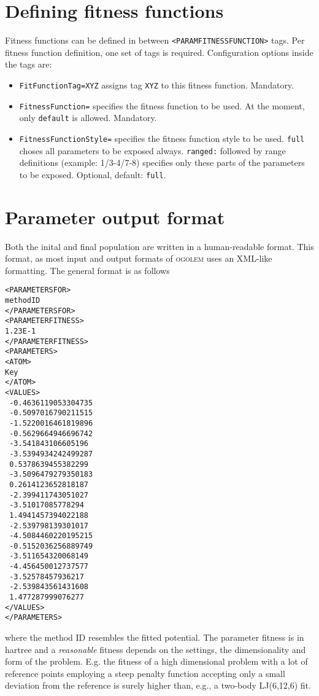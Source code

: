 \documentclass[a4paper,10pt]{scrbook}
\newcommand{\ogo}{\textsc{ogolem}}
\begin{document}
\section{Defining fitness functions}
\label{sec:paramfitfuncdef}
Fitness functions can be defined in between \texttt{<PARAMFITNESSFUNCTION>} 
tags. Per fitness function definition, one set of tags is required. 
Configuration options inside the tags are:
\begin{itemize}
  \item \texttt{FitFunctionTag=XYZ} assigns tag \texttt{XYZ} to this fitness 
function. Mandatory.
  \item \texttt{FitnessFunction=} specifies the fitness function to be used. At 
the moment, only \texttt{default} is allowed. Mandatory.
  \item \texttt{FitnessFunctionStyle=} specifies the fitness function style to 
be used. \texttt{full} choses all parameters to be exposed always. 
\texttt{ranged:} followed by range definitions (example: 1/3-4/7-8) specifies 
only these parts of the parameters to be exposed. Optional, default: 
\texttt{full}.
\end{itemize}

\section{Parameter output format}
Both the inital and final population are written in a human-readable format.
This format, as most input and output formats of \ogo{} uses an XML-like
formatting. The general format is as follows
\begin{verbatim}
<PARAMETERSFOR>
methodID
</PARAMETERSFOR>
<PARAMETERFITNESS>
1.23E-1
</PARAMETERFITNESS>
<PARAMETERS>
<ATOM>
Key
</ATOM>
<VALUES>
 -0.4636119053304735
 -0.5097016790211515
 -1.5220016461819896
 -0.5629664946696742
 -3.541843106605196
 -3.5394934242499287
 0.5378639455382299
 -3.5096479279350183
 0.2614123652818187
 -2.399411743051027
 -3.51017085778294
 1.4941457394022188
 -2.539798139301017
 -4.5084460220195215
 -0.5152036256889749
 -3.511654320068149
 -4.456450012737577
 -3.52578457936217
 -2.539843561431608
 1.477287999076277
</VALUES>
</PARAMETERS>
\end{verbatim}
where the method ID resembles the fitted potential. The parameter fitness is in
hartree and a \emph{reasonable} fitness depends on the settings, the
dimensionality and form of the problem. E.g. the fitness of a high dimensional
problem with a lot of reference points employing a steep penalty function
accepting only a small deviation from the reference is surely higher than, e.g.,
a two-body LJ(6,12,6) fit.
\end{document}

